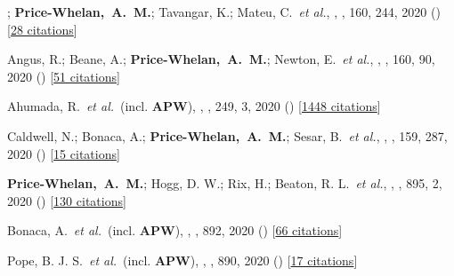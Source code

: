 \item[{\color{deemph}\scriptsize78}]; \textbf{Price-Whelan,~A.~M.}; Tavangar, K.; Mateu, C.~\textit{et al.}, , \aj, 160, 244, 2020 () [\href{http://adsabs.harvard.edu/abs/2020AJ....160..244S}{28 citations}]

\item[{\color{deemph}\scriptsize77}]Angus, R.; Beane, A.; \textbf{Price-Whelan,~A.~M.}; Newton, E.~\textit{et al.}, , \aj, 160, 90, 2020 () [\href{http://adsabs.harvard.edu/abs/2020AJ....160...90A}{51 citations}]

\item[{\color{deemph}\scriptsize76}]Ahumada, R.~\textit{et al.}~(incl. \textbf{APW}), , \apjs, 249, 3, 2020 () [\href{http://adsabs.harvard.edu/abs/2020ApJS..249....3A}{1448 citations}]

\item[{\color{deemph}\scriptsize75}]Caldwell, N.; Bonaca, A.; \textbf{Price-Whelan,~A.~M.}; Sesar, B.~\textit{et al.}, , \aj, 159, 287, 2020 () [\href{http://adsabs.harvard.edu/abs/2020AJ....159..287C}{15 citations}]

\item[{\color{deemph}\scriptsize74}]\textbf{Price-Whelan,~A.~M.}; Hogg, D. W.; Rix, H.; Beaton, R. L.~\textit{et al.}, , \apj, 895, 2, 2020 () [\href{http://adsabs.harvard.edu/abs/2020ApJ...895....2P}{130 citations}]

\item[{\color{deemph}\scriptsize73}]Bonaca, A.~\textit{et al.}~(incl. \textbf{APW}), , \apj, 892, 2020 () [\href{http://adsabs.harvard.edu/abs/2020ApJ...892L..37B}{66 citations}]

\item[{\color{deemph}\scriptsize72}]Pope, B. J. S.~\textit{et al.}~(incl. \textbf{APW}), , \apj, 890, 2020 () [\href{http://adsabs.harvard.edu/abs/2020ApJ...890L..19P}{17 citations}]

